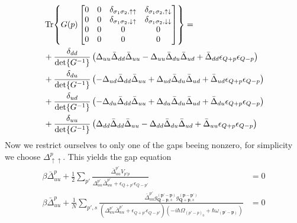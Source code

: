 \documentclass{article}
\begin{document}
\begin{align}
&\Tr{G(p) 
    \begin{bmatrix}
    0 & 0 & \delta_{\sigma_1 \sigma_2, \uparrow \uparrow} & \delta_{\sigma_1 \sigma_2, \uparrow \downarrow} \\
    0 & 0 & \delta_{\sigma_1 \sigma_2, \downarrow \uparrow} & \delta_{\sigma_1 \sigma_2, \downarrow \downarrow} \\ 
    0 & 0 & 0 & 0 \\ 
    0 & 0 & 0 & 0
    \end{bmatrix}}= \\ 
                &+ \frac{\delta_{dd}}{\det{G^{-1}}} \left(\Delta_{uu} \bar{\Delta}_{dd} \bar{\Delta}_{uu} - \Delta_{uu} \bar{\Delta}_{du} \bar{\Delta}_{ud} + \bar{\Delta}_{dd} \epsilon_{Q+p} \epsilon_{Q-p}\right) \nonumber\\ 
                &+ \frac{\delta_{du}}{\det{G^{-1}}} \left(- \Delta_{ud} \bar{\Delta}_{dd} \bar{\Delta}_{uu} + \Delta_{ud} \bar{\Delta}_{du} \bar{\Delta}_{ud} + \bar{\Delta}_{ud} \epsilon_{Q+p} \epsilon_{Q-p}\right) \nonumber\\
                &+ \frac{\delta_{ud}}{\det{G^{-1}}} \left(- \Delta_{du} \bar{\Delta}_{dd} \bar{\Delta}_{uu} + \Delta_{du} \bar{\Delta}_{du} \bar{\Delta}_{ud} + \bar{\Delta}_{du} \epsilon_{Q+p} \epsilon_{Q-p}\right) \nonumber\\
                &+ \frac{\delta_{uu}}{\det{G^{-1}}} \left(\Delta_{dd} \bar{\Delta}_{dd} \bar{\Delta}_{uu} - \Delta_{dd} \bar{\Delta}_{du} \bar{\Delta}_{ud} + \bar{\Delta}_{uu} \epsilon_{Q+p} \epsilon_{Q-p}\right) \nonumber\\ 
\end{align}
Now we restrict ourselves to only one of the gaps beeing nonzero, for simplicity we choose $\Delta_{\uparrow \uparrow}^{p}$. This yields the gap equation
\begin{align}
    \beta{\bar{\Delta}}_{uu}^{p} + \frac{1}{2} \sum_{p'} \frac{\bar{\Delta}_{uu}^{p'}  V_{p'p}}{\Delta_{uu}^{p'} \bar{\Delta}_{uu}^{p'} + \epsilon_{Q+p'} \epsilon_{Q-p'}}  &= 0\nonumber\\
    \beta{\bar{\Delta}}_{uu}^{p} + \frac{1}{N} \sum_{p',s} \frac{\bar{\Delta}_{uu}^{p'} g_{\textbf{Q} - \textbf{p},s}^{(\textbf{p'} - \textbf{p})} g_{\textbf{Q} + \textbf{p},s}^{(\textbf{p} - \textbf{p'})}}{\left(\Delta_{uu}^{p'} \bar{\Delta}_{uu}^{p'} + \epsilon_{Q+p'} \epsilon_{Q-p'}\right) \left(-i\hbar\Omega_{(p'-p)_0} + \hbar \omega_{(\textbf{p'} - \textbf{p})}\right)}  &= 0\nonumber \\
\end{align}
\end{document}
